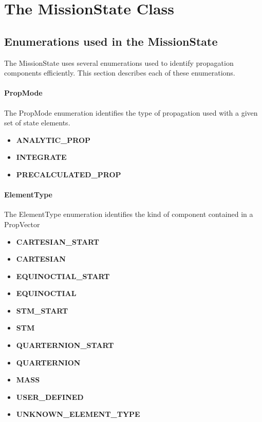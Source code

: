 \section{The MissionState Class}

%
%

\subsection{Enumerations used in the MissionState}

The MissionState uses several enumerations used to identify propagation components efficiently.
This section describes each of these enumerations.

\paragraph{PropMode}  The PropMode enumeration identifies the type of propagation used with a given
set of state elements.

\begin{itemize}
\item \textbf{ANALYTIC\_PROP}
\item \textbf{INTEGRATE}
\item \textbf{PRECALCULATED\_PROP}
\end{itemize}

\paragraph{ElementType}  The ElementType enumeration identifies the kind of component contained in
a PropVector

\begin{itemize}
\item \textbf{CARTESIAN\_START}
\item \textbf{CARTESIAN}
\item \textbf{EQUINOCTIAL\_START}
\item \textbf{EQUINOCTIAL}
\item \textbf{STM\_START}
\item \textbf{STM}
\item \textbf{QUARTERNION\_START}
\item \textbf{QUARTERNION}
\item \textbf{MASS}
\item \textbf{USER\_DEFINED}
\item \textbf{UNKNOWN\_ELEMENT\_TYPE}
\end{itemize}

